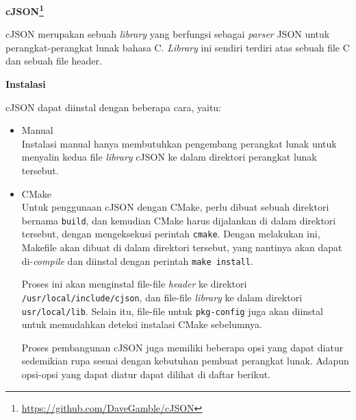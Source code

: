 \documentclass[a4paper,twoside]{article}
\begin{document}
\begin{enumerate}
\large{\textbf{cJSON\footnote{\href{https://github.com/DaveGamble/cJSON}{https://github.com/DaveGamble/cJSON}}}}
\label{sec:cmodules-cJSON}

cJSON merupakan sebuah \textit{library} yang berfungsi sebagai \textit{parser} JSON untuk perangkat-perangkat lunak bahasa C. \textit{Library} ini sendiri terdiri atas sebuah file C dan sebuah file header.

\textbf{Instalasi}
\label{sec:cmodules-cJSON-instalation}

cJSON dapat diinstal dengan beberapa cara, yaitu:

\begin{itemize}
	\item Manual\\
	Instalasi manual hanya membutuhkan pengembang perangkat lunak untuk menyalin kedua file \textit{library} cJSON ke dalam direktori perangkat lunak tersebut.
	\item CMake\\
	Untuk penggunaan cJSON dengan CMake, perlu dibuat sebuah direktori bernama \verb|build|, dan kemudian CMake harus dijalankan di dalam direktori tersebut, dengan mengeksekusi perintah \verb|cmake|. Dengan melakukan ini, Makefile akan dibuat di dalam direktori tersebut, yang nantinya akan dapat di-\textit{compile} dan diinstal dengan perintah \verb|make install|.
	
	Proses ini akan menginstal file-file \textit{header} ke direktori \verb|/usr/local/include/cjson|, dan file-file \textit{library} ke dalam direktori \verb|usr/local/lib|. Selain itu, file-file untuk \verb|pkg-config| juga akan diinstal untuk memudahkan deteksi instalasi CMake sebelumnya.
	
	Proses pembangunan cJSON juga memiliki beberapa opsi yang dapat diatur sedemikian rupa sesuai dengan kebutuhan pembuat perangkat lunak. Adapun opsi-opsi yang dapat diatur dapat dilihat di daftar berikut.


\end{itemize}
\end{enumerate}
\end{document}
